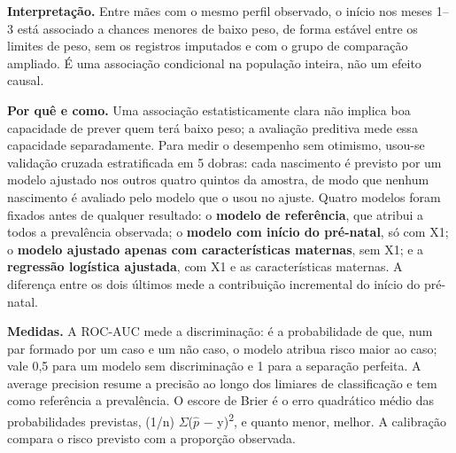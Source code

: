 \documentclass[10pt,a4paper]{article}
\newcommand{\menos}{\ensuremath{-}}
\newcommand{\subsecao}[2]{\par\needspace{5\baselineskip}\vspace{5pt}{\color{iptescuro}\bfseries{\color{iptazul}#1}~#2}\par\vspace{2pt}}
\begin{document}
{\color{iptescuro}\bfseries Interpretação.} Entre mães com o mesmo perfil observado, o início nos meses 1--3 está associado a chances menores de baixo peso, de forma estável entre os limites de peso, sem os registros imputados e com o grupo de comparação ampliado. É uma associação condicional na população inteira, não um efeito causal.\par

\subsecao{3.5}{Avaliação preditiva}

{\color{iptescuro}\bfseries Por quê e como.} Uma associação estatisticamente clara não implica boa capacidade de prever quem terá baixo peso; a avaliação preditiva mede essa capacidade separadamente. Para medir o desempenho sem otimismo, usou-se validação cruzada estratificada em 5 dobras: cada nascimento é previsto por um modelo ajustado nos outros quatro quintos da amostra, de modo que nenhum nascimento é avaliado pelo modelo que o usou no ajuste. Quatro modelos foram fixados antes de qualquer resultado: o \textbf{modelo de referência}, que atribui a todos a prevalência observada; o \textbf{modelo com início do pré-natal}, só com X1; o \textbf{modelo ajustado apenas com características maternas}, sem X1; e a \textbf{regressão logística ajustada}, com X1 e as características maternas. A diferença entre os dois últimos mede a contribuição incremental do início do pré-natal.\par

{\color{iptescuro}\bfseries Medidas.} A ROC-AUC mede a discriminação: é a probabilidade de que, num par formado por um caso e um não caso, o modelo atribua risco maior ao caso; vale 0,5 para um modelo sem discriminação e 1 para a separação perfeita. A average precision resume a precisão ao longo dos limiares de classificação e tem como referência a prevalência. O escore de Brier é o erro quadrático médio das probabilidades previstas, (1/n) \ensuremath{\Sigma}(\ensuremath{\hat p} \menos{} y)\textsuperscript{2}, e quanto menor, melhor. A calibração compara o risco previsto com a proporção observada.\par
\end{document}
